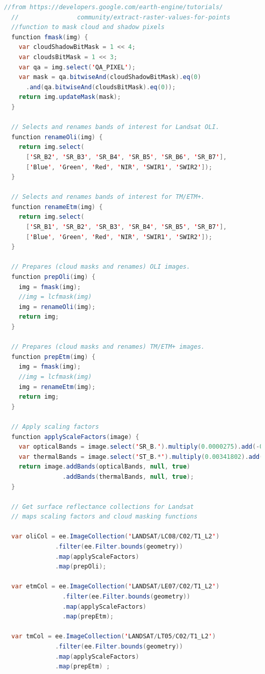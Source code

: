 \documentclass[
]{article}
\begin{document}
\begin{lstlisting}[language=Java]
  //from https://developers.google.com/earth-engine/tutorials/
  //                community/extract-raster-values-for-points
  //function to mask cloud and shadow pixels
  function fmask(img) {
    var cloudShadowBitMask = 1 << 4;
    var cloudsBitMask = 1 << 3;
    var qa = img.select('QA_PIXEL');
    var mask = qa.bitwiseAnd(cloudShadowBitMask).eq(0)
      .and(qa.bitwiseAnd(cloudsBitMask).eq(0));
    return img.updateMask(mask);
  }
  
  // Selects and renames bands of interest for Landsat OLI.
  function renameOli(img) {
    return img.select(
      ['SR_B2', 'SR_B3', 'SR_B4', 'SR_B5', 'SR_B6', 'SR_B7'],
      ['Blue', 'Green', 'Red', 'NIR', 'SWIR1', 'SWIR2']);
  }
  
  // Selects and renames bands of interest for TM/ETM+.
  function renameEtm(img) {
    return img.select(
      ['SR_B1', 'SR_B2', 'SR_B3', 'SR_B4', 'SR_B5', 'SR_B7'],
      ['Blue', 'Green', 'Red', 'NIR', 'SWIR1', 'SWIR2']);
  }
  
  // Prepares (cloud masks and renames) OLI images.
  function prepOli(img) {
    img = fmask(img);
    //img = lcfmask(img)
    img = renameOli(img);
    return img;
  }
  
  // Prepares (cloud masks and renames) TM/ETM+ images.
  function prepEtm(img) {
    img = fmask(img);
    //img = lcfmask(img)
    img = renameEtm(img);
    return img;
  }
  
  // Apply scaling factors
  function applyScaleFactors(image) {
    var opticalBands = image.select('SR_B.').multiply(0.0000275).add(-0.2);
    var thermalBands = image.select('ST_B.*').multiply(0.00341802).add(149.0);
    return image.addBands(opticalBands, null, true)
                .addBands(thermalBands, null, true);
  }
  
  // Get surface reflectance collections for Landsat
  // maps scaling factors and cloud masking functions 
  
  var oliCol = ee.ImageCollection('LANDSAT/LC08/C02/T1_L2')
              .filter(ee.Filter.bounds(geometry))
              .map(applyScaleFactors)
              .map(prepOli);
  
  var etmCol = ee.ImageCollection('LANDSAT/LE07/C02/T1_L2')
                .filter(ee.Filter.bounds(geometry))
                .map(applyScaleFactors)
                .map(prepEtm);
  
  var tmCol = ee.ImageCollection('LANDSAT/LT05/C02/T1_L2')
              .filter(ee.Filter.bounds(geometry))
              .map(applyScaleFactors)
              .map(prepEtm) ;
  

\end{lstlisting}
\end{document}
